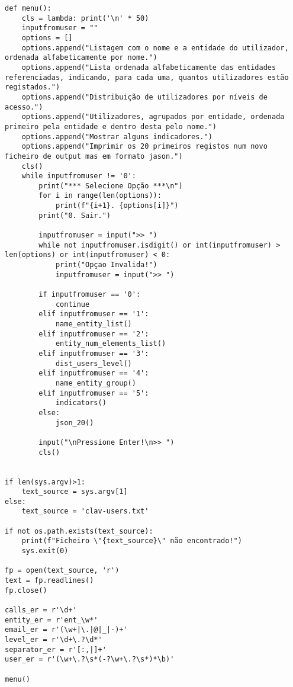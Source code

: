 \documentclass[11pt,a4paper]{report}%
\begin{document}
\begin{verbatim}
def menu():
    cls = lambda: print('\n' * 50)
    inputfromuser = ""
    options = []
    options.append("Listagem com o nome e a entidade do utilizador, ordenada alfabeticamente por nome.")
    options.append("Lista ordenada alfabeticamente das entidades referenciadas, indicando, para cada uma, quantos utilizadores estão registados.")
    options.append("Distribuição de utilizadores por níveis de acesso.")
    options.append("Utilizadores, agrupados por entidade, ordenada primeiro pela entidade e dentro desta pelo nome.")
    options.append("Mostrar alguns indicadores.")
    options.append("Imprimir os 20 primeiros registos num novo ficheiro de output mas em formato jason.")
    cls()
    while inputfromuser != '0':
        print("*** Selecione Opção ***\n")
        for i in range(len(options)):
            print(f"{i+1}. {options[i]}")
        print("0. Sair.")

        inputfromuser = input(">> ")
        while not inputfromuser.isdigit() or int(inputfromuser) > len(options) or int(inputfromuser) < 0:
            print("Opçao Invalida!")
            inputfromuser = input(">> ")

        if inputfromuser == '0':
            continue
        elif inputfromuser == '1':
            name_entity_list()
        elif inputfromuser == '2':
            entity_num_elements_list()
        elif inputfromuser == '3':
            dist_users_level()
        elif inputfromuser == '4':
            name_entity_group()
        elif inputfromuser == '5':
            indicators()
        else:
            json_20()

        input("\nPressione Enter!\n>> ")
        cls()


if len(sys.argv)>1:
    text_source = sys.argv[1]
else:
    text_source = 'clav-users.txt'

if not os.path.exists(text_source):
    print(f"Ficheiro \"{text_source}\" não encontrado!")
    sys.exit(0)

fp = open(text_source, 'r')
text = fp.readlines()
fp.close()

calls_er = r'\d+'
entity_er = r'ent_\w*'
email_er = r'(\w+|\.|@|_|-)+'
level_er = r'\d+\.?\d*'
separator_er = r'[:,|]+'
user_er = r'(\w+\.?\s*(-?\w+\.?\s*)*\b)'

menu()
\end{verbatim}







\end{document}

